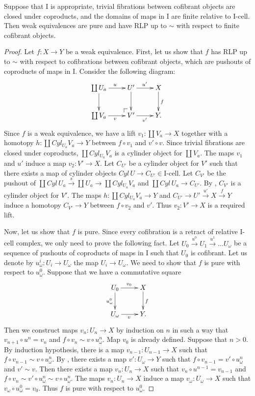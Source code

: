 \documentclass{amsart}
\makeatletter
\theoremstyle{definition}
\newcommand{\I}{\mathrm{I}}
\newcommand{\class}[2]{#1\text{-}\mathrm{#2}}
\newcommand{\Icell}[1][\I]{\class{#1}{cell}}
\newcommand{\po}[1][dr]{\save*!/#1+1.2pc/#1:(1,-1)@^{|-}\restore}
\makeatother
\begin{document}
\begin{prop}[we-pure]
Suppose that $\I$ is appropriate, trivial fibrations between cofibrant objects are closed under coproducts,
and the domains of maps in $\I$ are finite relative to $\Icell$.
Then weak equivalences are pure and have RLP up to $\sim$ with respect to finite cofibrant objects.
\end{prop}
\begin{proof}
Let $f : X \to Y$ be a weak equivalence.
First, let us show that $f$ has RLP up to $\sim$ with respect to
cofibrations between cofibrant objects, which are pushouts of coproducts of maps in $\I$.
Consider the following diagram:
\[ \xymatrix{ \coprod U_a \ar[r]^u \ar[d] &     U' \ar[r]^{u'} \ar[d] & X \ar[d]^f \\
              \coprod V_a \ar[r]_v        & \po V' \ar[r]_{v'}        & Y.
            } \]
Since $f$ is a weak equivalence, we have a lift $v_1 : \coprod V_a \to X$ together
with a homotopy $h : \coprod Cyl_{U_a} V_a \to Y$ between $f \circ v_1$ and $v' \circ v$.
Since trivial fibrations are closed under coproducts, $\coprod Cyl_{U_a} V_a$ is a cylinder object for $\coprod V_a$.
The maps $v_1$ and $u'$ induce a map $v_2 : V' \to X$.
Let $C_{U'}$ be a cylinder object for $V'$ such that there exists a map of cylinder objects $Cyl\,U \to C_{U'} \in \Icell$.
Let $C_{V'}$ be the pushout of $\coprod Cyl\,U_a \overset{s}\to \coprod U_a \to \coprod Cyl_{U_a} V_a$ and $\coprod Cyl\,U_a \to C_{U'}$.
By , $C_{V'}$ is a cylinder object for $V'$.
The maps $h : \coprod Cyl_{U_a} V_a \to Y$ and $C_{U'} \to U' \overset{u'}\to X \overset{f}\to Y$
induce a homotopy $C_{V'} \to Y$ between $f \circ v_2$ and $v'$.
Thus $v_2 : V' \to X$ is a required lift.

Now, let us show that $f$ is pure.
Since every cofibration is a retract of relative $\I$-cell complex, we only need to prove the following fact.
Let $U_0 \xrightarrow{u^0} U_1 \xrightarrow{u^1} \ldots U_\omega$ be a
sequence of pushouts of coproducts of maps in $\I$ such that $U_0$ is cofibrant.
Let us denote by $u^i_\omega : U_i \to U_\omega$ the map $U_i \to U_\omega$.
We need to show that $f$ is pure with respect to $u^0_\omega$.
Suppose that we have a commutative square
\[ \xymatrix{ U_0      \ar[r]^{v_0} \ar[d]_{u^0_\omega} & X \ar[d]^f \\
              U_\omega \ar[r]_v                         & Y.
            } \]
Then we construct maps $v_n : U_n \to X$ by induction on $n$ in such a
way that $v_{n+1} \circ u^n = v_n$ and $f \circ v_n \sim v \circ u^n_\omega$.
Map $v_0$ is already defined.
Suppose that $n > 0$.
By induction hypothesis, there is a map $v_{n-1} : U_{n-1} \to X$
such that $f \circ v_{n-1} \sim v \circ u^n_\omega$.
By , there exists a map $v' : U_\omega \to Y$
such that $f \circ v_{n-1} = v' \circ u^n_\omega$ and $v' \sim v$.
Then there exists a map $v_n : U_n \to X$ such that $v_n \circ u^{n-1} = v_{n-1}$
and $f \circ v_n \sim v' \circ u^n_\omega \sim v \circ u^n_\omega$.
The maps $v_n : U_n \to X$ induce a map $v_\omega : U_\omega \to X$ such that $v_\omega \circ u^0_\omega = v_0$.
Thus $f$ is pure with respect to $u^0_\omega$.


\end{proof}
\end{document}
